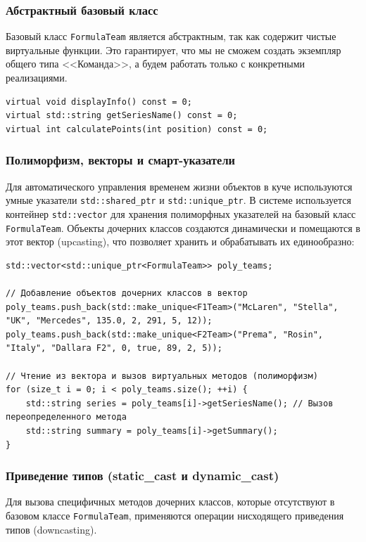 \documentclass[oneside,a4paper,14pt]{extarticle}
\begin{document}
\subsubsection*{Абстрактный базовый класс}
Базовый класс \texttt{FormulaTeam} является абстрактным, так как содержит чистые виртуальные функции. Это гарантирует, что мы не сможем создать экземпляр общего типа <<Команда>>, а будем работать только с конкретными реализациями.

\begin{verbatim}
virtual void displayInfo() const = 0;
virtual std::string getSeriesName() const = 0;
virtual int calculatePoints(int position) const = 0;
\end{verbatim}

\subsubsection*{Полиморфизм, векторы и смарт-указатели}
Для автоматического управления временем жизни объектов в куче используются умные указатели \texttt{std::shared\_ptr} и \texttt{std::unique\_ptr}. В системе используется контейнер \texttt{std::vector} для хранения полиморфных указателей на базовый класс \texttt{FormulaTeam}. Объекты дочерних классов создаются динамически и помещаются в этот вектор (upcasting), что позволяет хранить и обрабатывать их единообразно:

\begin{verbatim}
std::vector<std::unique_ptr<FormulaTeam>> poly_teams;

// Добавление объектов дочерних классов в вектор
poly_teams.push_back(std::make_unique<F1Team>("McLaren", "Stella", "UK", "Mercedes", 135.0, 2, 291, 5, 12));
poly_teams.push_back(std::make_unique<F2Team>("Prema", "Rosin", "Italy", "Dallara F2", 0, true, 89, 2, 5));

// Чтение из вектора и вызов виртуальных методов (полиморфизм)
for (size_t i = 0; i < poly_teams.size(); ++i) {
    std::string series = poly_teams[i]->getSeriesName(); // Вызов переопределенного метода
    std::string summary = poly_teams[i]->getSummary();
}
\end{verbatim}

\subsubsection*{Приведение типов (static\_cast и dynamic\_cast)}
Для вызова специфичных методов дочерних классов, которые отсутствуют в базовом классе \texttt{FormulaTeam}, применяются операции нисходящего приведения типов (downcasting). 
\end{document}
